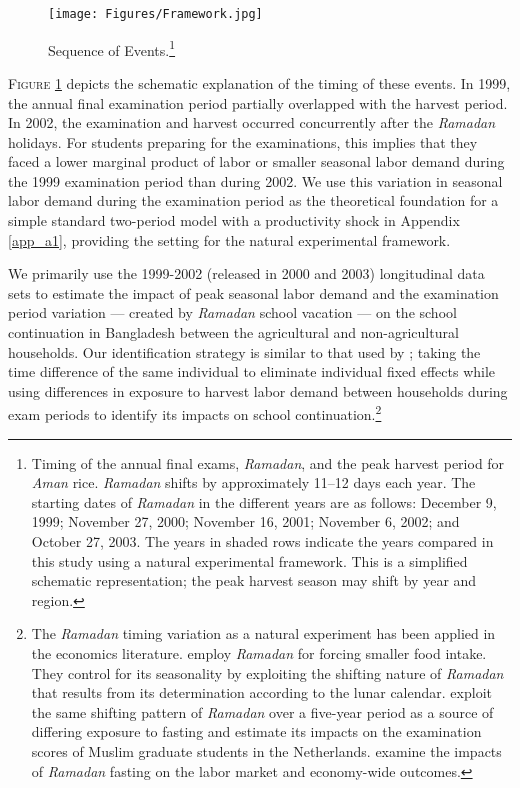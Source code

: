 \documentclass[12pt,letterpaper]{article}
\newcommand{\0}{\ensuremath{\mbox{\boldmath $0$}}}
\begin{document}
\begin{figure}[h!]
\centering
\texttt{[image: Figures/Framework.jpg]}\\
\caption{Sequence of Events.\footnote{Timing of the annual final exams, \textit{Ramadan}, and the peak harvest period for \textit{Aman} rice. \textit{Ramadan} shifts by approximately 11–12 days each year. The starting dates of \textit{Ramadan} in the different years are as follows: December 9, 1999; November 27, 2000; November 16, 2001; November 6, 2002; and October 27, 2003. The years in shaded rows indicate the years compared in this study using a natural experimental framework. This is a simplified schematic representation; the peak harvest season may shift by year and region.}}
\label{schedule}
\end{figure}

\textsc{\small Figure \ref{schedule}} depicts the schematic explanation of the timing of these events. In 1999, the annual final examination period partially overlapped with the harvest period. In 2002, the examination and harvest occurred concurrently after the \textit{Ramadan} holidays. For students preparing for the examinations, this implies that they faced a lower marginal product of labor or smaller seasonal labor demand during the 1999 examination period than during 2002. We use this variation in seasonal labor demand during the examination period as the theoretical foundation for a simple standard two-period model with a productivity shock in Appendix \ref{app_a1}, providing the setting for the natural experimental framework.

We primarily use the 1999-2002 (released in 2000 and 2003) longitudinal data sets to estimate the impact of peak seasonal labor demand and the examination period variation --- created by \textit{Ramadan} school vacation --- on the school continuation in Bangladesh between the agricultural and non-agricultural households. Our identification strategy is similar to that used by \citet{OosterbeekKlaauw2013}; taking the time difference of the same individual to eliminate individual fixed effects while using differences in exposure to harvest labor demand between households during exam periods to identify its impacts on school continuation.\footnote{The \textit{Ramadan} timing variation as a natural experiment has been applied in the economics literature. \citet{AlmondMazumder2011} employ \textit{Ramadan} for forcing smaller food intake. They control for its seasonality by exploiting the shifting nature of \textit{Ramadan} that results from its determination according to the lunar calendar. \citet{OosterbeekKlaauw2013} exploit the same shifting pattern of \textit{Ramadan} over a five-year period as a source of differing exposure to fasting and estimate its impacts on the examination scores of Muslim graduate students in the Netherlands. \citet{Campante2013} examine the impacts of \textit{Ramadan} fasting on the labor market and economy-wide outcomes.}
\end{document}

